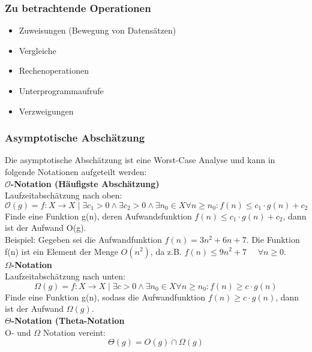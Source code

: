 \subsubsection{Zu betrachtende Operationen}
    \begin{itemize}
        \item Zuweisungen (Bewegung von Datensätzen)
        \item Vergleiche
        \item Rechenoperationen
        \item Unterprogrammaufrufe
        \item Verzweigungen
    \end{itemize}

\subsubsection{Asymptotische Abschätzung}
Die asymptotische Abschätzung ist eine Worst-Case Analyse und kann in folgende Notationen aufgeteilt werden:\\

\textbf{$\mathcal{O}$-Notation (Häufigste Abschätzung)}\\
Laufzeitabschätzung nach oben:
\begin{equation}
	\mathcal{O}(g) = {f: X \rightarrow X \mid \exists c_1>0 \wedge \exists c_2>0 \wedge \exists n_0 \in X  \forall n \geq n_0 : f(n) \leq c_1\cdot g(n) + c_2}
\end{equation}
Finde eine Funktion g(n), deren Aufwandsfunktion $f(n) \leq c_1 \cdot g(n) + c_2$, dann ist der Aufwand O(g).\\
Beispiel: Gegeben sei die Aufwandfunktion $f(n)=3n^2 + 6n + 7$. Die Funktion f(n) ist ein Element der Menge $O(n^2)$, da z.B. $f(n) \leq 9n^2 + 7$ \ \ $\forall n \geq 0$.\\

\textbf{$\Omega$-Notation}\\
Laufzeitabschätzung nach unten: 
\begin{equation}
\Omega(g) = {f: X \rightarrow X \mid \exists c>0 \wedge \exists n_0 \in X  \forall n \geq n_0 : f(n) \geq c\cdot g(n)}
\end{equation}
Finde eine Funktion g(n), sodass die Aufwandfunktion $f(n) \geq c \cdot g(n)$, dann ist der Aufwand $\Omega(g)$.\\

\textbf{$\Theta$-Notation (Theta-Notation}\\
O- und $\Omega$ Notation vereint: 
\begin{equation}
\Theta(g)= O(g) \cap \Omega(g)
\end{equation}\\

